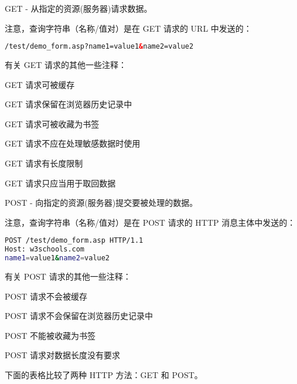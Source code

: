 \begin{compactitem}
\item GET - 从指定的资源(服务器)请求数据。

注意，查询字符串（名称/值对）是在 GET 请求的 URL 中发送的：

\begin{lstlisting}[language=HTML]
    /test/demo_form.asp?name1=value1&name2=value2
\end{lstlisting}

有关 GET 请求的其他一些注释：

\begin{compactitem}
\item GET 请求可被缓存
\item GET 请求保留在浏览器历史记录中
\item GET 请求可被收藏为书签
\item GET 请求不应在处理敏感数据时使用
\item GET 请求有长度限制
\item GET 请求只应当用于取回数据
\end{compactitem}

\item POST - 向指定的资源(服务器)提交要被处理的数据。

注意，查询字符串（名称/值对）是在 POST 请求的 HTTP 消息主体中发送的：

\begin{lstlisting}[language=bash]
POST /test/demo_form.asp HTTP/1.1
Host: w3schools.com
name1=value1&name2=value2
\end{lstlisting}

有关 POST 请求的其他一些注释：

\begin{compactitem}
\item POST 请求不会被缓存
\item POST 请求不会保留在浏览器历史记录中
\item POST 不能被收藏为书签
\item POST 请求对数据长度没有要求
\end{compactitem}


\end{compactitem}









下面的表格比较了两种 HTTP 方法：GET 和 POST。


